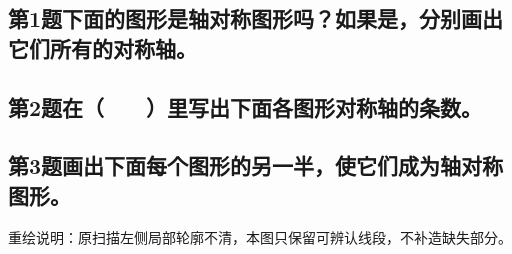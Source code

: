 \subsection*{第1题\quad 下面的图形是轴对称图形吗？如果是，分别画出它们所有的对称轴。}
\subsection*{第2题\quad 在（　　）里写出下面各图形对称轴的条数。}
\subsection*{第3题\quad 画出下面每个图形的另一半，使它们成为轴对称图形。}
{\normalsize\noindent 重绘说明：原扫描左侧局部轮廓不清，本图只保留可辨认线段，不补造缺失部分。\par}
